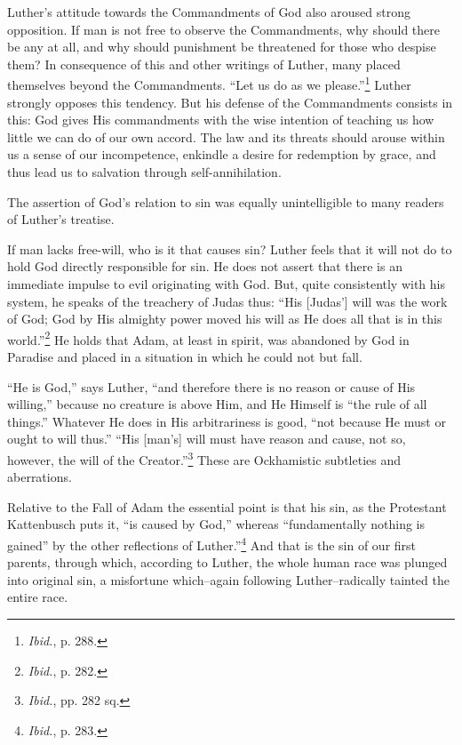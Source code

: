 Luther’s attitude towards the Commandments of God also aroused
strong opposition. If man is not free to observe the Commandments,
why should there be any at all, and why should punishment be
threatened for those who despise them? In consequence of this and
other writings of Luther, many placed themselves beyond the Commandments.
“Let us do as we please.”\footnote{\textit{Ibid.}, p. 288.}
Luther strongly opposes
this tendency. But his defense of the Commandments consists in
this: God gives His commandments with the wise intention of teaching us
how little we can do of our own accord. The law and its
threats should arouse within us a sense of our incompetence, enkindle
a desire for redemption by grace, and thus lead us to salvation through self-annihilation.

The assertion of God’s relation to sin was equally unintelligible
to many readers of Luther’s treatise.

If man lacks free-will, who is it that causes sin? Luther feels that it will
not do to hold God directly responsible for sin. He does not assert that there
is an immediate impulse to evil originating with God. But, quite consistently
with his system, he speaks of the treachery of Judas thus: “His [Judas’]
will was the work of God; God by His almighty power moved his will as He
does all that is in this world.”\footnote{\textit{Ibid.}, p. 282.}
He holds that Adam, at least in spirit, was
abandoned by God in Paradise and placed in a situation in which he could
not but fall.

“He is God,” says Luther, “and therefore there is no reason or cause of
His willing,” because no creature is above Him, and He Himself is “the
rule of all things.” Whatever He does in His arbitrariness is good, “not
because He must or ought to will thus.” “His [man’s] will must have reason
and cause, not so, however, the will of the Creator.”\footnote{\textit{Ibid.}, pp. 282 sq.}
These are Ockhamistic
subtleties and aberrations.

Relative to the Fall of Adam the essential point is that his sin, as the
Protestant Kattenbusch puts it, “is caused by God,” whereas “fundamentally
nothing is gained” by the other reflections of Luther.”\footnote{\textit{Ibid.}, p. 283.}
And that is the
sin of our first parents, through which, according to Luther, the whole
human race was plunged into original sin, a misfortune which--again following
Luther--radically tainted the entire race.

